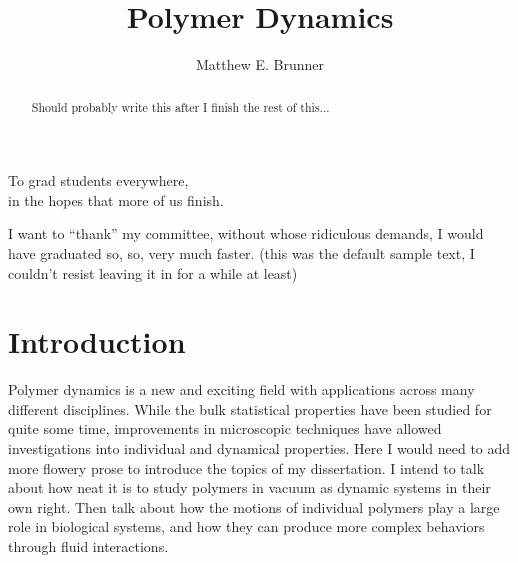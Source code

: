 \documentclass[11pt]{ucthesis}
\begin{document}

\title{Polymer Dynamics}
\author{Matthew E. Brunner}
\deanlinethree{}

\begin{frontmatter}

\maketitle

\tableofcontents
\listoffigures
\listoftables

\begin{abstract}
Should probably write this after I finish the rest of this...

\end{abstract}

\begin{dedication}
\null\vfil
{\large
\begin{center}
To grad students everywhere,\\\vspace{12pt}
in the hopes that more of us finish.
\end{center}}
\vfil\null
\end{dedication}


\begin{acknowledgements}
I want to ``thank'' my committee, without whose ridiculous demands, I
would have graduated so, so, very much faster.
(this was the default sample text, I couldn't resist leaving it in for a while at least)
\end{acknowledgements}

\end{frontmatter}



\chapter{Introduction}
Polymer dynamics is a new and exciting field with applications across many different disciplines. While the bulk statistical properties have been studied for quite some time, improvements in microscopic techniques have allowed investigations into individual and dynamical properties.
Here I would need to add more flowery prose to introduce the topics of my dissertation. I intend to talk about how neat it is to study polymers in vacuum as dynamic systems in their own right.
Then talk about how the motions of individual polymers play a large role in biological systems, and how they can produce more complex behaviors through fluid interactions.
\end{document}
